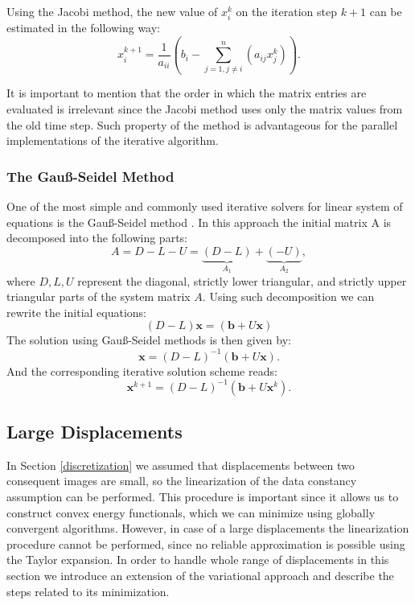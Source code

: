 Using the Jacobi method, the new value of $x_i^{k}$ on the iteration step $k+1$ can be estimated in the following way:
%
\begin{equation}
x_i^{k+1} = \frac{1}{a_{ii}} \left( 
b_i - 
\sum_{j=1, j \neq i}^{n} \left( a_{ij}x_j^{k}
\right) \right) .
\end{equation}

It is important to mention that  the order in which the matrix entries are evaluated is irrelevant since the Jacobi method uses only the matrix values from the old time step. Such property of the method is advantageous for the parallel implementations of the iterative algorithm.




\subsubsection{The Gau\ss -Seidel Method}
\label{gauss_method}

One of the most simple and commonly used iterative solvers for linear system of equations is the Gau\ss -Seidel method \cite{Saad03}. In this approach the initial matrix A is decomposed into the following parts:
$$ A = D - L - U = \underbrace{(D - L)}_{A_1} + \underbrace{(-U)}_{A_2}, $$
where $D, L, U$ represent the diagonal, strictly lower triangular, and strictly upper triangular parts of the system matrix $A$. Using such decomposition we can rewrite the initial equations:
$$ (D-L)\textbf{x} = (\textbf{b}+ U \textbf{x}) $$
The solution using  Gau\ss -Seidel methods is then given by:
$$ \textbf{x} = (D-L)^{-1}(\textbf{b}+ U \textbf{x}). $$
And the corresponding iterative solution scheme reads:
$$ \textbf{x}^{k+1} = (D-L)^{-1}(\textbf{b}+ U \textbf{x}^{k}). $$






\subsection{Large Displacements}
\label{large_displacements}

In Section \ref{discretization} we assumed that displacements between two consequent images are  small, so the linearization of the data constancy assumption can be performed. This procedure is important since it allows us to construct convex energy functionals, which we can minimize using globally convergent algorithms. However, in case of a large displacements the linearization procedure cannot be performed, since no reliable approximation is possible using the Taylor expansion. In order to handle whole range of displacements in this section we introduce an extension of the variational approach and describe the steps related to its minimization.

